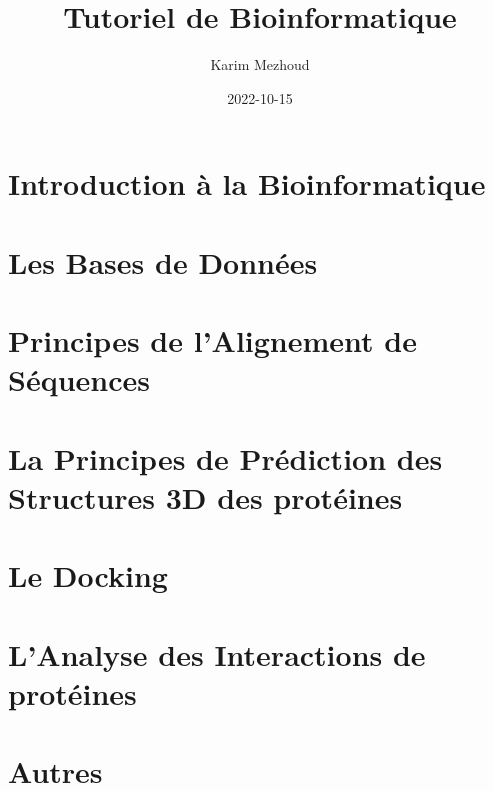 \documentclass[
]{book}
\title{Tutoriel de Bioinformatique}
\author{Karim Mezhoud}
\date{2022-10-15}
\begin{document}
\maketitle

{
\setcounter{tocdepth}{1}
\tableofcontents
}
\hypertarget{introduction-uxe0-la-bioinformatique}{%
\chapter{Introduction à la Bioinformatique}\label{introduction-uxe0-la-bioinformatique}}

\hypertarget{les-bases-de-donnuxe9es}{%
\chapter{Les Bases de Données}\label{les-bases-de-donnuxe9es}}

\hypertarget{cross}{%
\chapter{Principes de l'Alignement de Séquences}\label{cross}}

\hypertarget{la-principes-de-pruxe9diction-des-structures-3d-des-protuxe9ines}{%
\chapter{La Principes de Prédiction des Structures 3D des protéines}\label{la-principes-de-pruxe9diction-des-structures-3d-des-protuxe9ines}}

\hypertarget{le-docking}{%
\chapter{Le Docking}\label{le-docking}}

\hypertarget{lanalyse-des-interactions-de-protuxe9ines}{%
\chapter{L'Analyse des Interactions de protéines}\label{lanalyse-des-interactions-de-protuxe9ines}}

\hypertarget{autres}{%
\chapter{Autres}\label{autres}}

  
\end{document}
